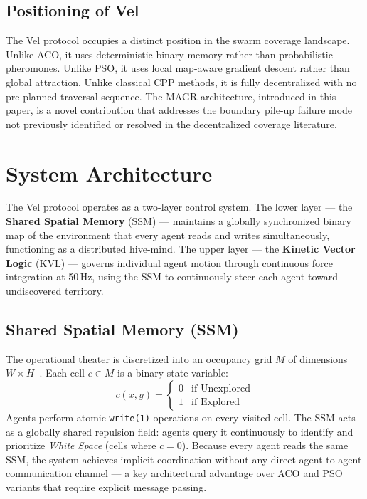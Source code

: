 \documentclass[journal,compsoc]{IEEEtran}
\begin{document}
\subsection{Positioning of Vel}

The Vel protocol occupies a distinct position in the swarm coverage landscape. Unlike
ACO, it uses deterministic binary memory rather than probabilistic pheromones. Unlike
PSO, it uses local map-aware gradient descent rather than global attraction. Unlike
classical CPP methods, it is fully decentralized with no pre-planned traversal sequence.
The MAGR architecture, introduced in this paper, is a novel contribution that addresses
the boundary pile-up failure mode not previously identified or resolved in the
decentralized coverage literature.

\section{System Architecture}
\label{sec:arch}

The Vel protocol operates as a two-layer control system. The lower layer ---
the \textbf{Shared Spatial Memory} (SSM) --- maintains a globally synchronized binary
map of the environment that every agent reads and writes simultaneously, functioning as
a distributed hive-mind. The upper layer --- the \textbf{Kinetic Vector Logic} (KVL)
--- governs individual agent motion through continuous force integration at 50\,Hz,
using the SSM to continuously steer each agent toward undiscovered territory.

\subsection{Shared Spatial Memory (SSM)}

The operational theater is discretized into an occupancy grid $M$ of dimensions
$W \times H$~\cite{moravec1985,elfes1989}. Each cell $c \in M$ is a binary state
variable:
\begin{equation}
    c(x,y) = \begin{cases} 0 & \text{if Unexplored} \\ 1 & \text{if Explored}
    \end{cases}
    \label{eq:cell}
\end{equation}
Agents perform atomic \texttt{write(1)} operations on every visited cell. The SSM
acts as a globally shared repulsion field: agents query it continuously to identify
and prioritize \emph{White Space} (cells where $c=0$). Because every agent reads the
same SSM, the system achieves implicit coordination without any direct agent-to-agent
communication channel --- a key architectural advantage over ACO and PSO variants that
require explicit message passing.
\end{document}
